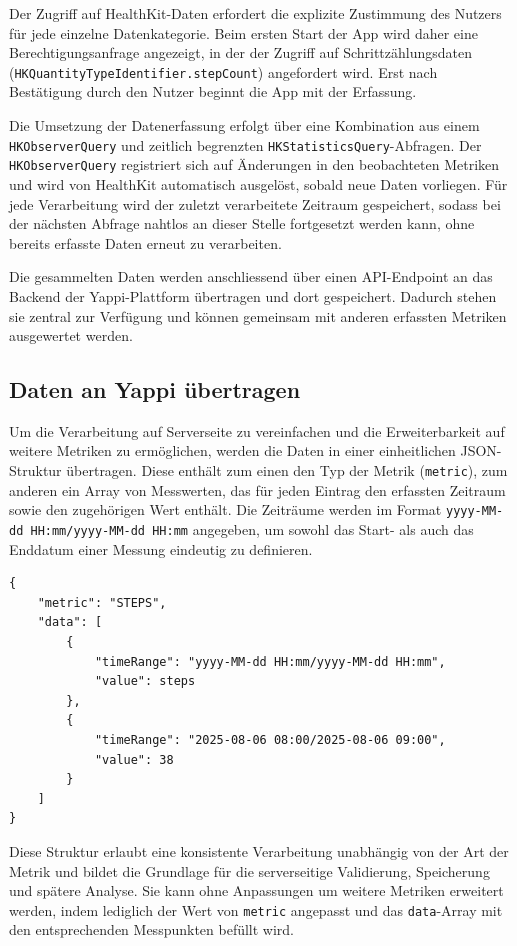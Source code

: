 \documentclass[12pt,a4paper]{report}
\begin{document}
Der Zugriff auf HealthKit-Daten erfordert die explizite Zustimmung des Nutzers für jede einzelne Datenkategorie. Beim ersten Start
der App wird daher eine Berechtigungsanfrage angezeigt, in der der Zugriff auf Schrittzählungsdaten 
(\texttt{HKQuantityTypeIdentifier.stepCount}) angefordert wird. Erst nach Bestätigung durch den Nutzer beginnt die App mit der
Erfassung.

Die Umsetzung der Datenerfassung erfolgt über eine Kombination aus einem \texttt{HKObserverQuery} und zeitlich begrenzten 
\texttt{HKStatisticsQuery}-Abfragen. Der \texttt{HKObserverQuery} registriert sich auf Änderungen in den beobachteten Metriken und
wird von HealthKit automatisch ausgelöst, sobald neue Daten vorliegen. Für jede Verarbeitung wird der zuletzt verarbeitete 
Zeitraum gespeichert, sodass bei der nächsten Abfrage nahtlos an dieser Stelle fortgesetzt werden kann, ohne bereits erfasste
Daten erneut zu verarbeiten.

Die gesammelten Daten werden anschliessend über einen API-Endpoint an das Backend der Yappi-Plattform übertragen und dort
gespeichert. Dadurch stehen sie zentral zur Verfügung und können gemeinsam mit anderen erfassten Metriken ausgewertet werden. 

\subsection{Daten an Yappi übertragen}

Um die Verarbeitung auf Serverseite zu vereinfachen und die Erweiterbarkeit auf weitere Metriken zu ermöglichen, werden die Daten
in einer einheitlichen JSON-Struktur übertragen. Diese enthält zum einen den Typ der Metrik (\texttt{metric}), zum anderen ein Array
von Messwerten, das für jeden Eintrag den erfassten Zeitraum sowie den zugehörigen Wert enthält. Die Zeiträume werden im
Format \texttt{yyyy-MM-dd~HH:mm/yyyy-MM-dd~HH:mm} angegeben, um sowohl das Start- als auch das Enddatum einer Messung eindeutig
zu definieren.

\begin{verbatim}
{
    "metric": "STEPS",
    "data": [
        {
            "timeRange": "yyyy-MM-dd HH:mm/yyyy-MM-dd HH:mm",
            "value": steps
        },
        {
            "timeRange": "2025-08-06 08:00/2025-08-06 09:00",
            "value": 38
        }
    ]
}
\end{verbatim}

Diese Struktur erlaubt eine konsistente Verarbeitung unabhängig von der Art der Metrik und bildet die Grundlage für die
serverseitige Validierung, Speicherung und spätere Analyse. Sie kann ohne Anpassungen um weitere Metriken erweitert werden,
indem lediglich der Wert von \texttt{metric} angepasst und das \texttt{data}-Array mit den entsprechenden Messpunkten befüllt
wird.
\end{document}
